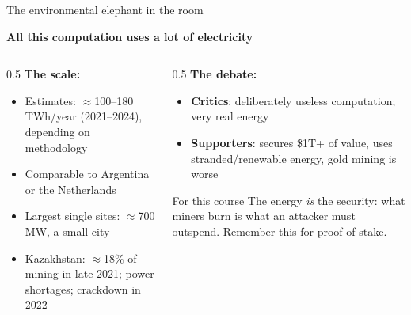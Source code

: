 \ifdefined\PRESENTATION\else\PassOptionsToClass{handout}{beamer}\fi\documentclass[aspectratio=169, lualatex]{beamer}
\begin{document}
\begin{frame}{The environmental elephant in the room}
	\begin{center}
		\textbf{All this computation uses a lot of electricity}
	\end{center}
	\begin{columns}[c]
		\begin{column}{0.5\textwidth}
			\textbf{The scale:}
			\begin{itemize}
				\item Estimates: $\approx$100--180 TWh/year (2021--2024), depending on methodology
				\item Comparable to Argentina or the Netherlands
				\item Largest single sites: $\approx$700 MW, a small city
				\item Kazakhstan: $\approx$18\% of mining in late 2021; power shortages; crackdown in 2022
			\end{itemize}
		\end{column}
		\begin{column}{0.5\textwidth}
			\textbf{The debate:}
			\begin{itemize}
				\item \textbf{Critics}: deliberately useless computation; very real energy
				\item \textbf{Supporters}: secures \$1T+ of value, uses stranded/renewable energy, gold mining is worse
			\end{itemize}
			\begin{alertblock}{For this course}
				The energy \emph{is} the security: what miners burn is what an attacker must outspend. Remember this for proof-of-stake.
			\end{alertblock}
		\end{column}
	\end{columns}
\end{frame}
\end{document}
